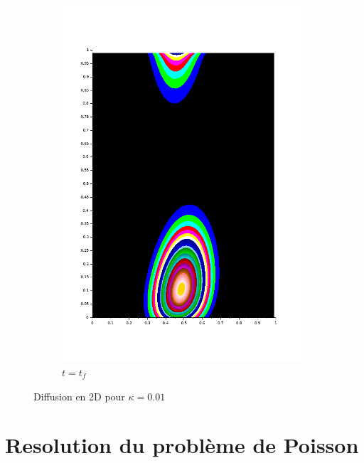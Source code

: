\documentclass{article}
\begin{document}
\begin{figure}
\begin{subfigure}[b]{0.5\textwidth}
		\includegraphics[width=\textwidth]{conv-2D_kappa_0,01_f.png}
		\caption{$t=t_f$}
	\end{subfigure}
	\caption{Diffusion en 2D pour $\kappa=0.01$}\label{fig:diff2D}
\end{figure}



\section{Resolution du problème de Poisson}
\end{document}
